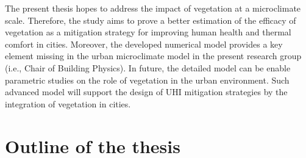 The present thesis hopes to address the impact of vegetation at a microclimate scale. Therefore, the study aims to prove a better estimation of the efficacy of vegetation as a mitigation strategy for improving human health and thermal comfort in cities. Moreover, the developed numerical model provides a key element missing in the urban microclimate model in the present research group (i.e., Chair of Building Physics). In future, the detailed model can be enable parametric studies on the role of vegetation in the urban environment. Such advanced model will support the design of UHI mitigation strategies by the integration of vegetation in cities.

\section{Outline of the thesis}

